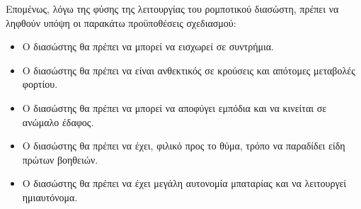 \par Επομένως, λόγω της φύσης της λειτουργίας του ρομποτικού διασώστη, πρέπει να ληφθούν υπόψη οι παρακάτω προϋποθέσεις σχεδιασμού:
\begin{itemize}
    \item Ο διασώστης θα πρέπει να μπορεί να εισχωρεί σε συντρήμια.
    \item Ο διασώστης θα πρέπει να είναι ανθεκτικός σε κρούσεις και απότομες μεταβολές φορτίου.
    \item Ο διασώστης θα πρέπει να μπορεί να αποφύγει εμπόδια και να κινείται σε ανώμαλο έδαφος.
    \item Ο διασώστης θα πρέπει να έχει, φιλικό προς το θύμα, τρόπο να παραδίδει είδη πρώτων βοηθειών. 
    \item Ο διασώστης θα πρέπει να έχει μεγάλη αυτονομία μπαταρίας και να λειτουργεί ημιαυτόνομα.
\end{itemize}

